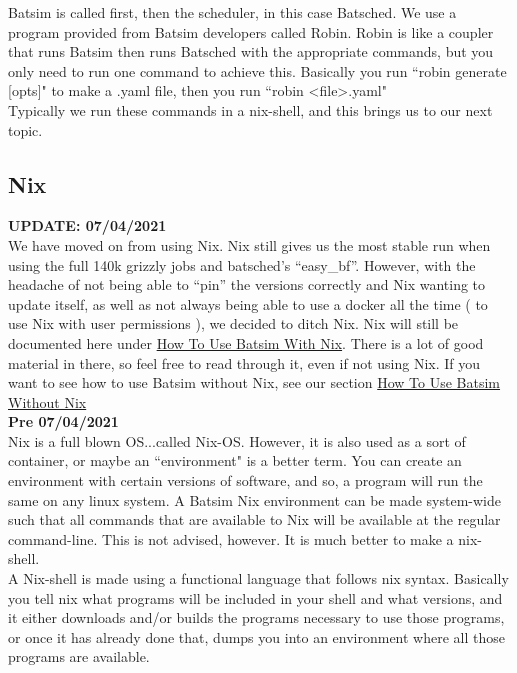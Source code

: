 \documentclass[titlepage]{article}
\newenvironment{regular}{\color{black}}{}
\begin{document}
\begin{regular}
Batsim is called first, then the scheduler, in this case Batsched.  We use a program provided from Batsim developers called
Robin.  Robin is like a coupler that runs Batsim then runs Batsched with the appropriate commands, but you only need to run
one command to achieve this.  Basically you run ``robin generate [opts]" to make a .yaml file, then you run ``robin <file>.yaml"\\

Typically we run these commands in a nix-shell, and this brings us to our next topic.
\end{regular}
\hypertarget{intro_nix}{}
\subsection{Nix}
\begin{regular}
\textbf{UPDATE: 07/04/2021} \\
We have moved on from using Nix.  Nix still gives us the most stable run when using the full 140k grizzly jobs and batsched's ``easy\_bf''.
However, with the headache of not being able to ``pin'' the versions correctly and Nix wanting to update itself, as well as not always being able to use
a docker all the time ( to use Nix with user permissions ), we decided to ditch Nix.  Nix will still be documented here under \hyperlink{how_to_use_batsim_nix}{How To Use Batsim With Nix}.
There is a lot of good material in there, so feel free to read through it, even if not using Nix. If you want to see how to use Batsim without Nix,
see our section \hyperlink{how_to_use_batsim_wo_nix}{How To Use Batsim Without Nix}\\

\textbf{Pre 07/04/2021}\\ 
Nix is a full blown OS...called Nix-OS.  However, it is also used as a sort of container, or maybe an ``environment" is a better term.  You can create an
environment with certain versions of software, and so, a program will run the same on any linux system.  A Batsim Nix environment can be made system-wide such that all
commands that are available to Nix will be available at the regular command-line.  This is not advised, however.  It is much better to make a nix-shell.\\

A Nix-shell is made using a functional language that follows nix syntax.  Basically you tell nix what programs will be included in your shell and what versions,
and it either downloads and/or builds the programs necessary to use those programs, or once it has already done that, dumps you into an environment where all
those programs are available.\\


\end{regular}
\end{document}
